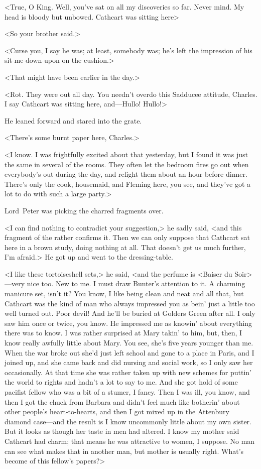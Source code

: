 <True, O King. Well, you've sat on all my discoveries so far. Never mind. My head is bloody but unbowed. Cathcart was sitting here\longdash>

<So your brother said.>

<Curse you, I say he was; at least, somebody was; he's left the impression of his sit-me-down-upon on the cushion.>

<That might have been earlier in the day.>

<Rot. They were out all day. You needn't overdo this Sadducee attitude, Charles. I say Cathcart was sitting here, and—Hullo! Hullo!>

He leaned forward and stared into the grate.

<There's some burnt paper here, Charles.>

<I know. I was frightfully excited about that yesterday, but I found it was just the same in several of the rooms. They often let the bedroom fires go out when everybody's out during the day, and relight them about an hour before dinner. There's only the cook, housemaid, and Fleming here, you see, and they've got a lot to do with such a large party.>

Lord~Peter was picking the charred fragments over.

<I can find nothing to contradict your suggestion,> he sadly said, <and this fragment of the  rather confirms it. Then we can only suppose that Cathcart sat here in a brown study, doing nothing at all. That doesn't get us much further, I'm afraid.> He got up and went to the dressing-table.

<I like these tortoiseshell sets,> he said, <and the perfume is <Baiser du Soir>—very nice too. New to me. I must draw Bunter's attention to it. A charming manicure set, isn't it? You know, I like being clean and neat and all that, but Cathcart was the kind of man who always impressed you as bein' just a little too well turned out. Poor devil! And he'll be buried at Golders Green after all. I only saw him once or twice, you know. He impressed me as knowin' about everything there was to know. I was rather surprised at Mary takin' to him, but, then, I know really awfully little about Mary. You see, she's five years younger than me. When the war broke out she'd just left school and gone to a place in Paris, and I joined up, and she came back and did nursing and social work, so I only saw her occasionally. At that time she was rather taken up with new schemes for puttin' the world to rights and hadn't a lot to say to me. And she got hold of some pacifist fellow who was a bit of a stumer, I fancy. Then I was ill, you know, and then I got the chuck from Barbara and didn't feel much like botherin' about other people's heart-to-hearts, and then I got mixed up in the Attenbury diamond case—and the result is I know uncommonly little about my own sister. But it looks as though her taste in men had altered. I know my mother said Cathcart had charm; that means he was attractive to women, I suppose. No man can see what makes that in another man, but mother is usually right. What's become of this fellow's papers?>

